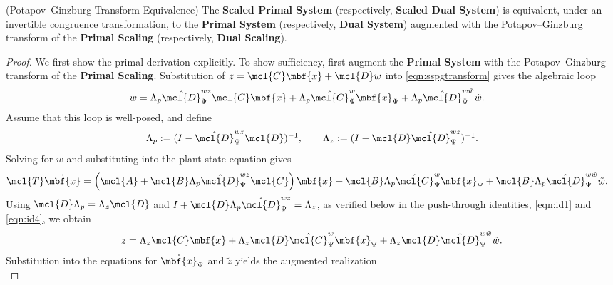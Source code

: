 \begin{lemma} (Potapov--Ginzburg Transform Equivalence)\label{lem:pgequivalence}
The \textbf{Scaled Primal System} (respectively, \textbf{Scaled Dual
System}) is equivalent, under an invertible congruence transformation,
to the \textbf{Primal System} (respectively, \textbf{Dual System})
augmented with the Potapov--Ginzburg transform of the \textbf{Primal
Scaling} (respectively, \textbf{Dual Scaling}).
\end{lemma}
\begin{proof}
    We first show the primal derivation explicitly. To show
    sufficiency, first augment the \textbf{Primal System} with the
    Potapov--Ginzburg transform of the \textbf{Primal Scaling}.
    Substitution of $z=\mcl{C}\mbf{x}+\mcl{D}w$ into
    \eqref{eqn:sspgtransform} gives the algebraic loop
    \begin{align*}
        w
            &=
            \Lambda_p\hat{\mcl{D}}_\Psi^{wz}\mcl{C}\mbf{x}
            +\Lambda_p\hat{\mcl{C}}_\Psi^w\mbf{x}_\Psi
            +\Lambda_p\hat{\mcl{D}}_\Psi^{w\tilde{w}}\tilde{w}.
    \end{align*}
    Assume that this loop is well-posed, and define
    \begin{equation*}
        \Lambda_p := (I-\hat{\mcl{D}}_\Psi^{wz}\mcl{D})^{-1},
        \qquad
        \Lambda_z := (I-\mcl{D}\hat{\mcl{D}}_\Psi^{wz})^{-1}.
    \end{equation*}
    Solving for $w$ and substituting into the plant state equation gives
    \begin{align*}
        \mcl{T}\dot{\mbf{x}}
            &= \left(\mcl{A}
                +\mcl{B}\Lambda_p\hat{\mcl{D}}_\Psi^{wz}\mcl{C}\right)\mbf{x}
               +\mcl{B}\Lambda_p\hat{\mcl{C}}_\Psi^w\mbf{x}_\Psi
               +\mcl{B}\Lambda_p\hat{\mcl{D}}_\Psi^{w\tilde{w}}\tilde{w}.
    \end{align*}
    Using $\mcl{D}\Lambda_p=\Lambda_z\mcl{D}$ and
    $I+\mcl{D}\Lambda_p\hat{\mcl{D}}_\Psi^{wz}=\Lambda_z$, as verified
    below in the push-through identities, \eqref{eqn:id1} and \eqref{eqn:id4}, we obtain
    \begin{equation*}
        z
        =
        \Lambda_z\mcl{C}\mbf{x}
        +\Lambda_z\mcl{D}\hat{\mcl{C}}_\Psi^w\mbf{x}_\Psi
        +\Lambda_z\mcl{D}\hat{\mcl{D}}_\Psi^{w\tilde{w}}\tilde{w}.
    \end{equation*}
    Substitution into the equations for $\dot{\mbf{x}}_\Psi$ and
    $\tilde{z}$ yields the augmented realization
    \begin{equation}\label{eqn:potapov}

\end{equation}
\end{proof}

